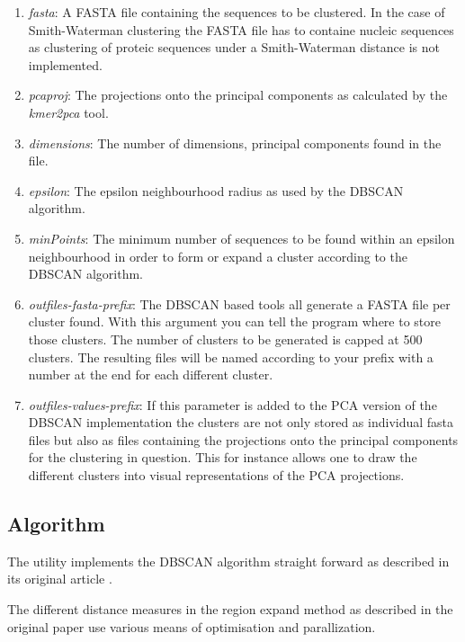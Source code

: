 \begin{enumerate}
  \item \emph{fasta}: A FASTA file containing the sequences to be
    clustered. In the case of Smith-Waterman clustering the FASTA file
    has to containe nucleic sequences as clustering of proteic
    sequences under a Smith-Waterman distance is not implemented.
  \item \emph{pcaproj}: The projections onto the principal components
    as calculated by the \emph{kmer2pca} tool. 
  \item \emph{dimensions}: The number of dimensions, principal
    components found in the file.
  \item \emph{epsilon}: The epsilon neighbourhood radius as used by the DBSCAN
    \cite{dbscan} algorithm.
  \item \emph{minPoints}: The minimum number of sequences to be found
    within an epsilon neighbourhood in order to form or expand a
    cluster according to the DBSCAN algorithm.
  \item \emph{outfiles-fasta-prefix}: The DBSCAN based tools all
    generate a FASTA file per cluster found. With this argument you
    can tell the program where to store those clusters. The number of
    clusters to be generated is capped at 500 clusters. The resulting
    files will be named according to your prefix with a number at the
    end for each different cluster.
  \item \emph{outfiles-values-prefix}: If this parameter is added to
    the PCA version of the DBSCAN implementation the clusters are not
    only stored as individual fasta files but also as files containing
    the projections onto the principal components for the clustering
    in question. This for instance allows one to draw the different
    clusters into visual representations of the PCA projections.
\end{enumerate}

\subsection{Algorithm}

The utility implements the DBSCAN algorithm straight forward as
described in its original article \cite{dbscan}.

The different distance measures in the region expand method as
described in the original paper use various means of optimisation and
parallization.






    
